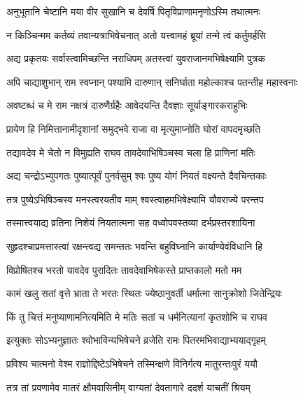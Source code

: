\twolineshloka
{अनुभूतानि चेष्टानि मया वीर सुखानि च}
{देवर्षि पितृविप्राणामनृणोऽस्मि तथात्मनः} %

\twolineshloka
{न किञ्चिन्मम कर्तव्यं तवान्यत्राभिषेचनात्}
{अतो यत्त्वामहं ब्रूयां तन्मे त्वं कर्तुमर्हसि} %

\twolineshloka
{अद्य प्रकृतयः सर्वास्त्वामिच्छन्ति नराधिपम्}
{अतस्त्वां युवराजानमभिषेक्ष्यामि पुत्रक} %

\twolineshloka
{अपि चाद्याशुभान् राम स्वप्नान् पश्यामि दारुणान्}
{सनिर्घाता महोल्काश्च पतन्तीह महास्वनाः} %

\twolineshloka
{अवष्टब्धं च मे राम नक्षत्रं दारुणैर्ग्रहैः}
{आवेदयन्ति दैवज्ञाः सूर्याङ्गारकराहुभिः} %

\twolineshloka
{प्रायेण हि निमित्तानामीदृशानां समुद्भवे}
{राजा वा मृत्युमाप्नोति घोरां वापदमृच्छति} %

\twolineshloka
{तद्यावदेव मे चेतो न विमुह्यति राघव}
{तावदेवाभिषिञ्चस्व चला हि प्राणिनां मतिः} %

\twolineshloka
{अद्य चन्द्रोऽभ्युपगतः पुष्यात्पूर्वं पुनर्वसुम्}
{श्वः पुष्य योगं नियतं वक्ष्यन्ते दैवचिन्तकाः} %

\twolineshloka
{तत्र पुष्येऽभिषिञ्चस्व मनस्त्वरयतीव माम्}
{श्वस्त्वाहमभिषेक्ष्यामि यौवराज्ये परन्तप} %

\twolineshloka
{तस्मात्त्वयाद्य व्रतिना निशेयं नियतात्मना}
{सह वध्वोपवस्तव्या दर्भप्रस्तरशायिना} %

\twolineshloka
{सुहृदश्चाप्रमत्तास्त्वां रक्षन्त्वद्य समन्ततः}
{भवन्ति बहुविघ्नानि कार्याण्येवंविधानि हि} %

\twolineshloka
{विप्रोषितश्च भरतो यावदेव पुरादितः}
{तावदेवाभिषेकस्ते प्राप्तकालो मतो मम} %

\twolineshloka
{कामं खलु सतां वृत्ते भ्राता ते भरतः स्थितः}
{ज्येष्ठानुवर्ती धर्मात्मा सानुक्रोशो जितेन्द्रियः} %

\twolineshloka
{किं तु चित्तं मनुष्याणामनित्यमिति मे मतिः}
{सतां च धर्मनित्यानां कृतशोभि च राघव} %

\twolineshloka
{इत्युक्तः सोऽभ्यनुज्ञातः श्वोभाविन्यभिषेचने}
{व्रजेति रामः पितरमभिवाद्याभ्ययाद्गृहम्} %

\twolineshloka
{प्रविश्य चात्मनो वेश्म राज्ञोद्दिष्टेऽभिषेचने}
{तस्मिन्क्षणे विनिर्गत्य मातुरन्तःपुरं ययौ} %

\twolineshloka
{तत्र तां प्रवणामेव मातरं क्षौमवासिनीम्}
{वाग्यतां देवतागारे ददर्श याचतीं श्रियम्} %

